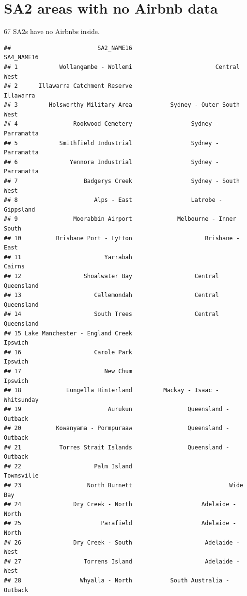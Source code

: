 \documentclass[]{article}
\begin{document}
\newpage

\section{SA2 areas with no Airbnb
data}\label{sa2-areas-with-no-airbnb-data}

67 SA2s have no Airbnbs inside.

\begin{verbatim}
##                         SA2_NAME16                          SA4_NAME16
## 1            Wollangambe - Wollemi                        Central West
## 2      Illawarra Catchment Reserve                           Illawarra
## 3         Holsworthy Military Area           Sydney - Outer South West
## 4                Rookwood Cemetery                 Sydney - Parramatta
## 5            Smithfield Industrial                 Sydney - Parramatta
## 6               Yennora Industrial                 Sydney - Parramatta
## 7                   Badgerys Creek                 Sydney - South West
## 8                      Alps - East                 Latrobe - Gippsland
## 9                Moorabbin Airport             Melbourne - Inner South
## 10          Brisbane Port - Lytton                     Brisbane - East
## 11                        Yarrabah                              Cairns
## 12                  Shoalwater Bay                  Central Queensland
## 13                     Callemondah                  Central Queensland
## 14                     South Trees                  Central Queensland
## 15 Lake Manchester - England Creek                             Ipswich
## 16                     Carole Park                             Ipswich
## 17                        New Chum                             Ipswich
## 18             Eungella Hinterland         Mackay - Isaac - Whitsunday
## 19                         Aurukun                Queensland - Outback
## 20          Kowanyama - Pormpuraaw                Queensland - Outback
## 21           Torres Strait Islands                Queensland - Outback
## 22                     Palm Island                          Townsville
## 23                   North Burnett                            Wide Bay
## 24               Dry Creek - North                    Adelaide - North
## 25                       Parafield                    Adelaide - North
## 26               Dry Creek - South                     Adelaide - West
## 27                  Torrens Island                     Adelaide - West
## 28                 Whyalla - North           South Australia - Outback

\end{verbatim}
\end{document}
